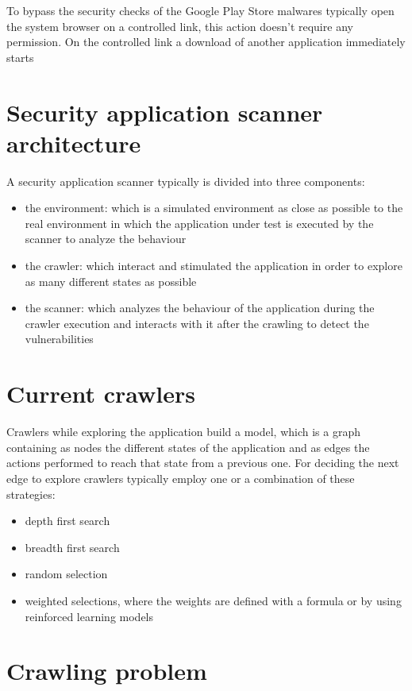 To bypass the security checks of the Google Play Store malwares
typically open the system browser on a controlled link, this action
doesn't require any permission. On the controlled link a download of
another application immediately starts

\section{Security application scanner
architecture}\label{security-application-scanner-architecture}

A security application scanner typically is divided into three
components:

\begin{itemize}
\item
  the environment: which is a simulated environment as close as possible
  to the real environment in which the application under test is
  executed by the scanner to analyze the behaviour
\item
  the crawler: which interact and stimulated the application in order to
  explore as many different states as possible
\item
  the scanner: which analyzes the behaviour of the application during
  the crawler execution and interacts with it after the crawling to
  detect the vulnerabilities
\end{itemize}

\section{Current crawlers}\label{current-crawlers}

Crawlers while exploring the application build a model, which is a graph
containing as nodes the different states of the application and as edges
the actions performed to reach that state from a previous one. For
deciding the next edge to explore crawlers typically employ one or a
combination of these strategies:

\begin{itemize}
\tightlist
\item
  depth first search
\item
  breadth first search
\item
  random selection
\item
  weighted selections, where the weights are defined with a formula or
  by using reinforced learning models
\end{itemize}

\section{Crawling problem}\label{crawling-problem}

